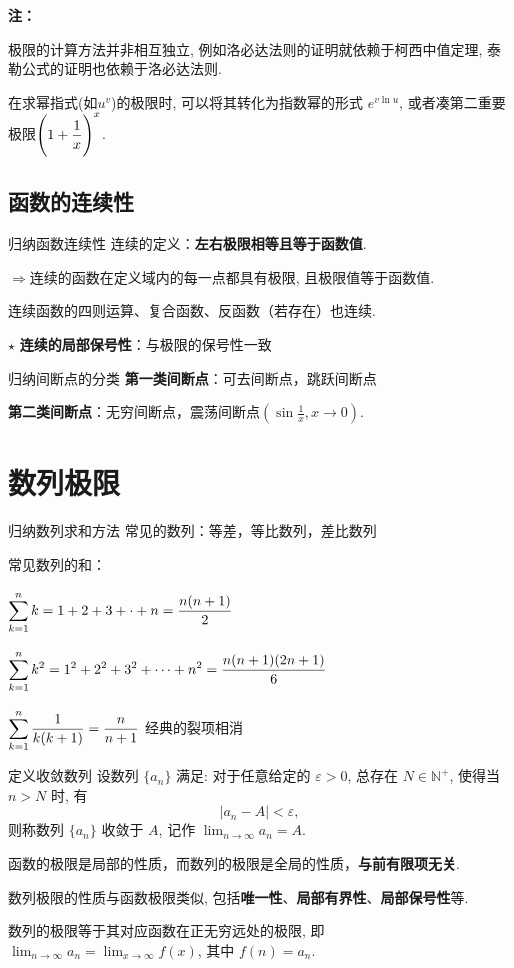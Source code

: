 \documentclass[a4paper,12pt,oneside,fontset=none]{ctexbook}
\let\olddfrac\dfrac
\renewcommand{\dfrac}[2]{
    \olddfrac{#1\vrule width 0pt height 1.15em depth 0em}{#2\vrule width 0pt height 0em depth 0.6em}
}
\let\oldlim\lim
\renewcommand{\lim}{\displaystyle\oldlim}
\let\oldsum\sum
\renewcommand{\sum}{\displaystyle\oldsum}
\newenvironment{induction}[1][]{\begin{thmBox}{归纳}{#1}}{\end{thmBox}}
\newcounter{definition}[chapter]
\newenvironment{definition}[1][]{\begin{defBox}{定义}{#1}}{\end{defBox}}
\newenvironment{note}{
    \par\vspace{0.5em}\noindent
    \textbf{\color{NoteColor} 注：}
}{
    \par\vspace{0.5em}
}
\numberwithin{equation}{chapter}
\begin{document}
\begin{note}
极限的计算方法并非相互独立, 例如洛必达法则的证明就依赖于柯西中值定理, 泰勒公式的证明也依赖于洛必达法则.

在求幂指式(如$u^v$)的极限时, 可以将其转化为指数幂的形式 $e^{v\ln u}$, 或者凑第二重要极限$\left(1 + \dfrac{1}{x}\right)^{x}$.
\end{note}


\section{函数的连续性}

\begin{induction}[函数连续性]
连续的定义：\textbf{左右极限相等且等于函数值}.

$\Rightarrow $连续的函数在定义域内的每一点都具有极限, 且极限值等于函数值.

连续函数的四则运算、复合函数、反函数（若存在）也连续.

$\star$ \textbf{连续的局部保号性}：与极限的保号性一致
\end{induction}


\begin{induction}[间断点的分类]
\textbf{第一类间断点}：可去间断点，跳跃间断点

\textbf{第二类间断点}：无穷间断点，震荡间断点$(\sin \frac{1}{x}, x\to 0)$.
\end{induction}



\chapter{数列极限}

\begin{induction}[数列求和方法]
常见的数列：等差，等比数列，差比数列

常见数列的和：

$\sum_{k=1}^{n} k = 1+2+3+\cdot+n = \dfrac{n(n+1)}{2}$

$\sum_{k=1}^{n} k^2 = 1^2+2^2+3^2+\cdots+n^2 = \dfrac{n(n+1)(2n+1)}{6}$

$\sum_{k=1}^{n} \dfrac{1}{k(k+1)} = \dfrac{n}{n+1}$ 经典的裂项相消

\end{induction}

\begin{definition}[收敛数列]
设数列 $\{a_n\}$ 满足: 对于任意给定的 $\varepsilon > 0$, 总存在 $N \in \mathbb{N}^+$, 使得当 $n > N$ 时, 有
\[
    |a_n - A| < \varepsilon,
\]
则称数列 $\{a_n\}$ 收敛于 $A$, 记作 $\lim_{n \to \infty} a_n = A$.

函数的极限是局部的性质，而数列的极限是全局的性质，\textbf{与前有限项无关}.

数列极限的性质与函数极限类似, 包括\textbf{唯一性}、\textbf{局部有界性}、\textbf{局部保号性}等.

数列的极限等于其对应函数在正无穷远处的极限, 即 $\lim_{n \to \infty} a_n = \lim_{x \to \infty} f(x)$, 其中 $f(n) = a_n$.

\end{definition}
\end{document}
